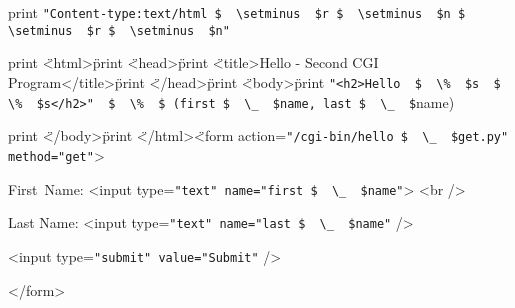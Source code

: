 \begin {enumerate}
\begin {enumerate}
print \verb|"Content-type:text/html $  \setminus  $r $  \setminus  $n $  \setminus  $r $  \setminus  $n"|

print \"<html>\"

print \"<head>\"

print \"<title>Hello - Second CGI Program</title>\"

print \"</head>\"

print \"<body>\"

print \verb|"<h2>Hello  $  \%  $s  $  \%  $s</h2>"  $  \%  $ (first $  \_  $name, last $  \_  $|name)

print \"</body>\"

print \"</html>\"

<form action=\verb|"/cgi-bin/hello $  \_  $get.py" method="get"|>

First~Name: <input type=\verb|"text" name="first $  \_  $name"|>  <br />

Last Name: <input type=\verb|"text" name="last $  \_  $name"| />

<input type=\verb|"submit" value="Submit"| /> 

</form>


\end{enumerate}
\end{enumerate}
